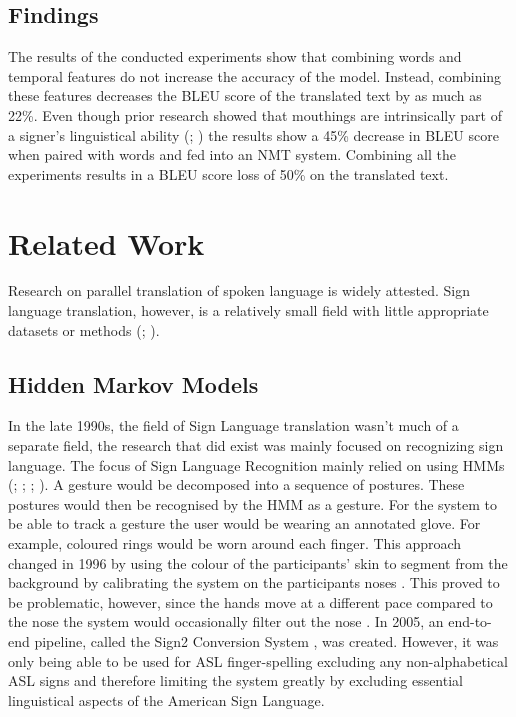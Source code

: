 \subsection{Findings}

The results of the conducted experiments show that combining words and temporal features do not increase the accuracy of the model. Instead, combining these features decreases the BLEU score of the translated text by as much as 22\%. Even though prior research showed that mouthings are intrinsically part of a signer's linguistical ability (\citealp{pfaff1979constraints};  \citealp{kristoffersen2016designing}) the results show a 45\% decrease in BLEU score when paired with words and fed into an NMT system. Combining all the experiments results in a BLEU score loss of 50\% on the translated text.

\section{Related Work}

Research on parallel translation of spoken language is widely attested. Sign language translation, however, is a relatively small field with little appropriate datasets or methods (\citealp{camgoz2021content4all}; \citealp{bragg2019sign}).

\subsection{Hidden Markov Models}
In the late 1990s, the field of Sign Language translation wasn't much of a separate field, the research that did exist was mainly focused on recognizing sign language. The focus of Sign Language Recognition mainly relied on using HMMs (\citealp{hiddenmarkov1l}; \citealp{hiddenmarkov2}; \citealp{hiddenmarkov3}; \citealp{holden2005australian}). A gesture would be decomposed into a sequence of postures. These postures would then be recognised by the HMM as a gesture. For the system to be able to track a gesture the user would be wearing an annotated glove. For example, coloured rings would be worn around each finger. This approach changed in 1996 by using the colour of the participants' skin to segment from the background by calibrating the system on the participants noses \cite{starner1998real}. This proved to be problematic, however, since the hands move at a different pace compared to the nose the system would occasionally filter out the nose \cite{starner1998real}. In 2005, an end-to-end pipeline, called the Sign2 Conversion System \cite{glenn2005image}, was created. However, it was only being able to be used for ASL finger-spelling excluding any non-alphabetical ASL signs and therefore limiting the system greatly by excluding essential linguistical aspects of the American Sign Language.

